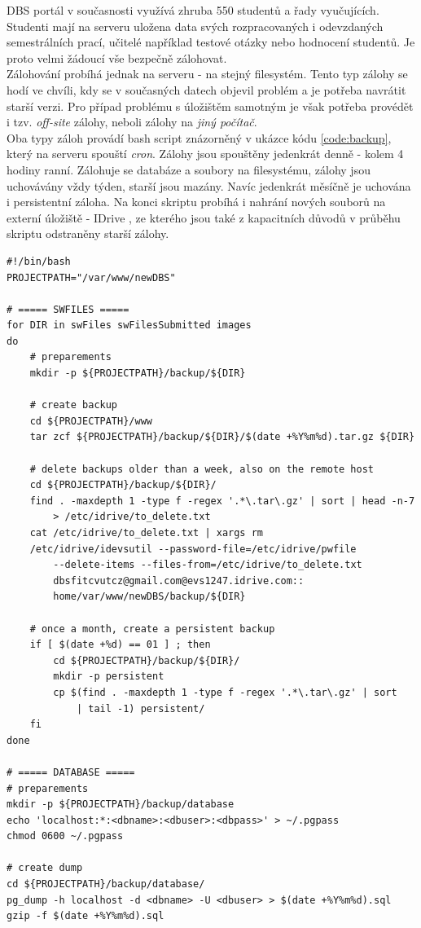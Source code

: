 DBS portál v současnosti využívá zhruba 550 studentů a řady vyučujících. Studenti mají na serveru uložena data svých rozpracovaných i odevzdaných semestrálních prací, učitelé například testové otázky nebo hodnocení studentů. Je proto velmi žádoucí vše bezpečně zálohovat.\\
Zálohování probíhá jednak na serveru - na stejný filesystém. Tento typ zálohy se hodí ve chvíli, kdy se v současných datech objevil problém a je potřeba navrátit starší verzi. Pro případ problému s úložištěm samotným je však potřeba provédět i tzv. \emph{off-site} zálohy, neboli zálohy na \emph{jiný počítač}.\\
Oba typy záloh provádí bash script znázorněný v ukázce kódu \ref{code:backup}, který na serveru spouští \emph{cron}. Zálohy jsou spouštěny jedenkrát denně - kolem 4 hodiny ranní. Zálohuje se databáze a soubory na filesystému, zálohy jsou uchovávány vždy týden, starší jsou mazány. Navíc jedenkrát měsíčně je uchována i persistentní záloha. Na konci skriptu probíhá i nahrání nových souborů na externí úložiště - IDrive \cite{idrive}, ze kterého jsou také z kapacitních důvodů v průběhu skriptu odstraněny starší zálohy.
\begin{listing}[H]
	\begin{verbatim}
#!/bin/bash
PROJECTPATH="/var/www/newDBS"

# ===== SWFILES =====
for DIR in swFiles swFilesSubmitted images
do
    # preparements
    mkdir -p ${PROJECTPATH}/backup/${DIR}

    # create backup
    cd ${PROJECTPATH}/www
    tar zcf ${PROJECTPATH}/backup/${DIR}/$(date +%Y%m%d).tar.gz ${DIR}

    # delete backups older than a week, also on the remote host
    cd ${PROJECTPATH}/backup/${DIR}/
    find . -maxdepth 1 -type f -regex '.*\.tar\.gz' | sort | head -n-7
        > /etc/idrive/to_delete.txt
    cat /etc/idrive/to_delete.txt | xargs rm
    /etc/idrive/idevsutil --password-file=/etc/idrive/pwfile
        --delete-items --files-from=/etc/idrive/to_delete.txt
        dbsfitcvutcz@gmail.com@evs1247.idrive.com::
        home/var/www/newDBS/backup/${DIR}

    # once a month, create a persistent backup
    if [ $(date +%d) == 01 ] ; then
        cd ${PROJECTPATH}/backup/${DIR}/
        mkdir -p persistent
        cp $(find . -maxdepth 1 -type f -regex '.*\.tar\.gz' | sort
            | tail -1) persistent/
    fi
done

# ===== DATABASE =====
# preparements
mkdir -p ${PROJECTPATH}/backup/database
echo 'localhost:*:<dbname>:<dbuser>:<dbpass>' > ~/.pgpass
chmod 0600 ~/.pgpass

# create dump
cd ${PROJECTPATH}/backup/database/
pg_dump -h localhost -d <dbname> -U <dbuser> > $(date +%Y%m%d).sql
gzip -f $(date +%Y%m%d).sql
    \end{verbatim}
\end{listing}
